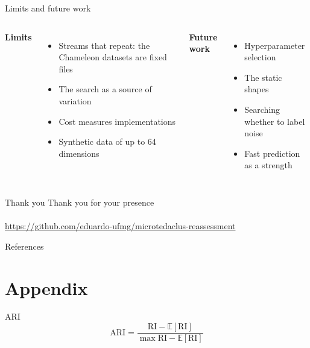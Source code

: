\documentclass[aspectratio=169]{beamer}
\begin{document}
\begin{frame}{Limits and future work}
  \begin{columns}[t]
    \textbf{Limits}
    \begin{itemize}
      \item Streams that repeat: the Chameleon datasets are fixed files
      \item The search as a source of variation
      \item Cost measures implementations
      \item Synthetic data of up to 64 dimensions
    \end{itemize}
    \textbf{Future work}
    \begin{itemize}
      \item Hyperparameter selection
      \item The static shapes
      \item Searching whether to label noise
      \item Fast prediction as a strength
    \end{itemize}
  \end{columns}
\end{frame}

\begin{frame}{Thank you}
  \centering
  \vfill
  {\Large Thank you for your presence}\\[1.5em]
  \\[0.8em]
  \footnotesize\url{https://github.com/eduardo-ufmg/microtedaclus-reassessment}
  \vfill
\end{frame}

\begin{frame}[allowframebreaks]{References}
  \footnotesize
  
  
\end{frame}

\appendix
\section{Appendix}

\begin{frame}{ARI}
  \[
    \mathrm{ARI} = \frac{\mathrm{RI} - \mathbb{E}[\mathrm{RI}]}{\max \mathrm{RI} - \mathbb{E}[\mathrm{RI}]}
  \]
\end{frame}
\end{document}
